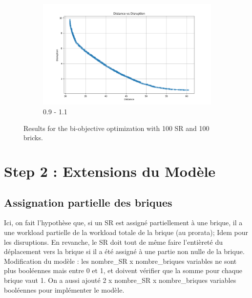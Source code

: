 \documentclass[12pt,a4paper]{article}
\begin{document}
\begin{figure}[H]
\begin{subfigure}{0.32\textwidth}
        \label{fig:solve2}
    \end{subfigure}
    \hfill
    \begin{subfigure}{0.32\textwidth}
        \centering
        \includegraphics[width=\textwidth]{figures/solve1-100-0.9.png}
        \caption{0.9 - 1.1}
        \label{fig:solve3}
    \end{subfigure}
    \caption{Results for the bi-objective optimization with 100 SR and 100 bricks.}
    \label{fig:all_solves}
\end{figure}

\section*{Step 2 : Extensions du Modèle}

\subsection*{Assignation partielle des briques}
Ici, on fait l'hypothèse que, si un SR est assigné partiellement à une brique, il a une workload partielle de la workload totale de la brique (au prorata); Idem pour les disruptions. En revanche, le SR doit tout de même faire l'entièreté du déplacement vers la brique si il a été assigné à une partie non nulle de la brique.
\\
Modification du modèle : les nombre\_SR x nombre\_briques variables ne sont plus booléennes mais entre 0 et 1, et doivent vérifier que la somme pour chaque brique vaut 1.
On a aussi ajouté 2 x nombre\_SR x nombre\_briques variables booléennes pour implémenter le modèle.
\\
\end{document}
